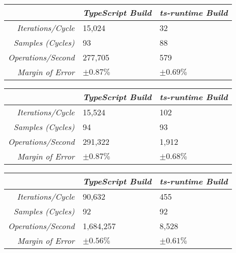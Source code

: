 \begin{minipage}{\textwidth}
\begin{center}
{
\centering
\tabulinesep=1.2mm
\setlength{\tabcolsep}{5mm}
\def\arraystretch{1.25}
\small
\begin{tabu} to \textwidth {|r||X[c,m]|X[c,m]|}
  \hline
  & \emph{TypeScript Build} & \emph{ts-runtime Build} \\
  \hline
  \hline
  \emph{Iterations/Cycle}  & 15,024 & 32 \\
  \hline
  \emph{Samples (Cycles)}  & 93 & 88 \\
  \hline
  \emph{Operations/Second} & 277,705 & 579 \\
  \hline
  \emph{Margin of Error}   & $\pm 0.87\%$ & $\pm 0.69\%$ \\
  \hline
\end{tabu}
}
\end{center}

\begin{center}
{
\centering
\tabulinesep=1.2mm
\setlength{\tabcolsep}{5mm}
\def\arraystretch{1.25}
\small
\begin{tabu} to \textwidth {|r||X[c,m]|X[c,m]|}
  \hline
  & \emph{TypeScript Build} & \emph{ts-runtime Build} \\
  \hline
  \hline
  \emph{Iterations/Cycle}  & 15,524 & 102 \\
  \hline
  \emph{Samples (Cycles)}  & 94 & 93 \\
  \hline
  \emph{Operations/Second} & 291,322 & 1,912 \\
  \hline
  \emph{Margin of Error}   & $\pm 0.87\%$ & $\pm 0.68\%$ \\
  \hline
\end{tabu}
}
\end{center}
\end{minipage}

\begin{center}
{
\centering
\tabulinesep=1.2mm
\setlength{\tabcolsep}{5mm}
\def\arraystretch{1.25}
\small
\begin{tabu} to \textwidth {|r||X[c,m]|X[c,m]|}
  \hline
  & \emph{TypeScript Build} & \emph{ts-runtime Build} \\
  \hline
  \hline
  \emph{Iterations/Cycle}  & 90,632 & 455 \\
  \hline
  \emph{Samples (Cycles)}  & 92 & 92 \\
  \hline
  \emph{Operations/Second} & 1,684,257 & 8,528 \\
  \hline
  \emph{Margin of Error}   & $\pm 0.56\%$ & $\pm 0.61\%$ \\
  \hline
\end{tabu}
}
\end{center}

